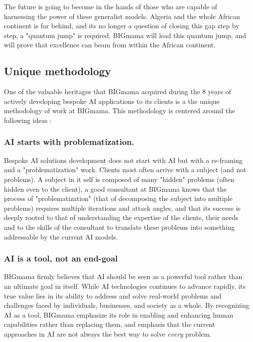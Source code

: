 \documentclass[a4paper,12pt]{article}
\begin{document}
The future is going to become in the hands of those who are capable of harnessing the power of these generalist models. Algeria and the whole African continent is far behind, and its no longer a question of closing this gap step by step, a "quantum jump" is required. BIGmama will lead this quantum jump, and will prove that excellence can beam from within the African continent. 

\subsection{Unique methodology}
One of the valuable heritages that BIGmama acquired during the 8 years of actively developing bespoke AI applications to its clients is a the unique methodology of work at BIGmama. 
This methodology is centered around the following ideas : 

\subsubsection{AI starts with problematization.}
Bespoke AI solutions development does not start with AI but with a re-framing and a "problematization" work. 
Clients most often arrive with a subject (and not problems). A subject in it self is composed of many "hidden" problems (often hidden even to the client), 
a good consultant at BIGmama knows that the process of "problematization" (that of decomposing the subject into multiple problems) requires multiple iterations and attack angles, 
and that its success is deeply rooted to that of understanding the expertise of the clients, their needs and to the skills of the consultant to translate these problems into something addressable 
by the current AI models.

\subsubsection{AI is a tool, not an end-goal}
BIGmama firmly believes that AI should be seen as a powerful tool rather than an ultimate goal in itself. While AI technologies continues to advance rapidly, 
its true value lies in its ability to address and solve real-world problems and challenges faced by individuals, businesses, and society as a whole.
By recognizing AI as a tool, BIGmama emphasize its role in enabling and enhancing human capabilities rather than replacing them, and emphasis that the current 
approaches in AI are not always the best way to solve \textit{every} problem.
\end{document}

